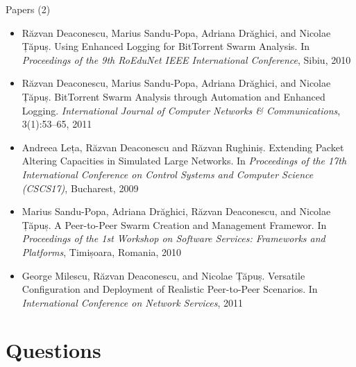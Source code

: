 \documentclass{beamer}
\begin{document}
\begin{frame}{Papers (2)}
  \begin{itemize}
    \item Răzvan Deaconescu, Marius Sandu-Popa, Adriana Drăghici, and Nicolae
    Țăpuș. Using Enhanced Logging for BitTorrent Swarm Analysis. In
    \textit{Proceedings of the 9th RoEduNet IEEE International Conference},
    Sibiu, 2010
    \item Răzvan Deaconescu, Marius Sandu-Popa, Adriana Drăghici, and Nicolae
    Țăpuș. BitTorrent Swarm Analysis through Automation and Enhanced Logging.
    \textit{International Journal of Computer Networks \& Communications},
    3(1):53--65, 2011
    \item Andreea Leța, Răzvan Deaconescu and Răzvan Rughiniș. Extending Packet
    Altering Capacities in Simulated Large Networks. In \textit{Proceedings of
    the 17th International Conference on Control Systems and Computer Science
    (CSCS17)}, Bucharest, 2009
    \item Marius Sandu-Popa, Adriana Drăghici, Răzvan Deaconescu, and Nicolae
    Țăpuș. A Peer-to-Peer Swarm Creation and Management Framewor. In
    \textit{Proceedings of the 1st Workshop on Software Services: Frameworks and
    Platforms}, Timișoara, Romania, 2010
    \item George Milescu, Răzvan Deaconescu, and Nicolae Țăpuș. Versatile
    Configuration and Deployment of Realistic Peer-to-Peer Scenarios. In
    \textit{International Conference on Network Services}, 2011
  \end{itemize}
\end{frame}

\section{Questions}
\end{document}
